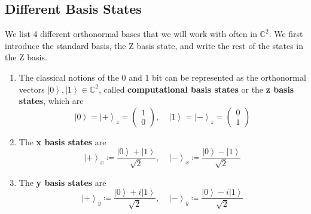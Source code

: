 \documentclass{article}
\newcommand{\ket}[1]{\ensuremath{\left|#1\right\rangle}}
\begin{document}
  
  \subsection{Different Basis States}

    \begin{definition}
      We list 4 different orthonormal bases that we will work with often in $\mathbb{C}^2$. We first introduce the standard basis, the Z basis state, and write the rest of the states in the Z basis. 

      \begin{enumerate}
        \item The classical notions of the $0$ and $1$ bit can be represented as the orthonormal vectors $\ket{0}, \ket{1} \in \mathbb{C}^2$, called \textbf{computational basis states} or the \textbf{z basis states}, which are
          \[\ket{0} = \ket{+}_z = \begin{pmatrix} 1 \\ 0 \end{pmatrix}, \;\;\;\; \ket{1} = \ket{-}_z = \begin{pmatrix} 0 \\ 1 \end{pmatrix}\]  

        \item The \textbf{x basis states} are 
          \begin{equation}
            \ket{+}_x \coloneqq \frac{\ket{0} + \ket{1}}{\sqrt{2}} , \;\;\;\; \ket{-}_x \coloneqq \frac{\ket{0} - \ket{1}}{\sqrt{2}} 
            \label{eq:x_basis}
          \end{equation}
        
        \item The \textbf{y basis states} are 
          \begin{equation}
            \ket{+}_y \coloneqq \frac{\ket{0} + i \ket{1}}{\sqrt{2}} , \;\;\;\; \ket{-}_y \coloneqq \frac{\ket{0} - i \ket{1}}{\sqrt{2}} 
            \label{eq:y_basis}
          \end{equation}
      \end{enumerate}      
    \end{definition}
\end{document}
